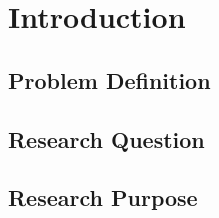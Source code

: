 \chapter{Introduction}

\section{Problem Definition}

\section{Research Question}

\section{Research Purpose}